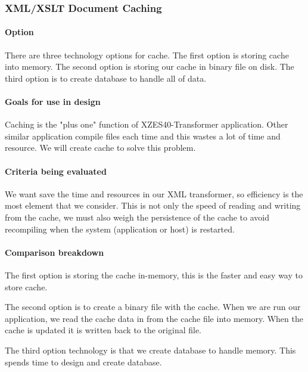 \subsubsection{XML/XSLT Document Caching}

\paragraph{Option}

There are three technology options for cache.
The first option is storing cache into memory.
The second option is storing our cache in binary file on disk.
The third option is to create database to handle all of data.

\paragraph{Goals for use in design}

Caching is the "plus one" function of XZES40-Transformer application.
Other similar application compile files each time and this wastes a lot of time and resource.
We will create cache to solve this problem. 

\paragraph{Criteria being evaluated}

We want save the time and resources in our XML transformer, so efficiency is the most element that we consider.
This is not only the speed of reading and writing from the cache, we must also weigh the persistence of the cache to avoid recompiling when the system (application or host) is restarted.

\paragraph{Comparison breakdown}

The first option is storing the cache in-memory, this is the faster and easy way to store cache.

The second option is to create a binary file with the cache.
When we are run our application, we read the cache data in from the cache file into memory.
When the cache is updated it is written back to the original file.

The third option technology is that we create database to handle memory.
This spends time to design and create database.

